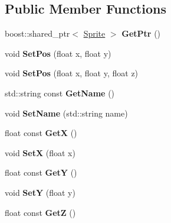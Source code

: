 \subsection*{Public Member Functions}
\begin{DoxyCompactItemize}
\item 
boost\+::shared\+\_\+ptr$<$ \hyperlink{class_sprite}{Sprite} $>$ {\bfseries Get\+Ptr} ()\hypertarget{class_sprite_af2665e7f459c2df1b74e69daaf44c19a}{}\label{class_sprite_af2665e7f459c2df1b74e69daaf44c19a}

\item 
void {\bfseries Set\+Pos} (float x, float y)\hypertarget{class_sprite_afea5e8f8f745b1db09b86f45943283af}{}\label{class_sprite_afea5e8f8f745b1db09b86f45943283af}

\item 
void {\bfseries Set\+Pos} (float x, float y, float z)\hypertarget{class_sprite_a31d06db54797d787445bee85b71f5dcd}{}\label{class_sprite_a31d06db54797d787445bee85b71f5dcd}

\item 
std\+::string const {\bfseries Get\+Name} ()\hypertarget{class_sprite_aa590f40b37b1a933aa373d907f5c8ae5}{}\label{class_sprite_aa590f40b37b1a933aa373d907f5c8ae5}

\item 
void {\bfseries Set\+Name} (std\+::string name)\hypertarget{class_sprite_a03e3fa1da28c44d7731cf09bba12fa08}{}\label{class_sprite_a03e3fa1da28c44d7731cf09bba12fa08}

\item 
float const {\bfseries GetX} ()\hypertarget{class_sprite_ad878be7d0af1494307f89cc8b4d06dbf}{}\label{class_sprite_ad878be7d0af1494307f89cc8b4d06dbf}

\item 
void {\bfseries SetX} (float x)\hypertarget{class_sprite_a87a083a64e6684aa8c5fe9965f3093af}{}\label{class_sprite_a87a083a64e6684aa8c5fe9965f3093af}

\item 
float const {\bfseries GetY} ()\hypertarget{class_sprite_ab639bc265bb54792c4bbf64dca743139}{}\label{class_sprite_ab639bc265bb54792c4bbf64dca743139}

\item 
void {\bfseries SetY} (float y)\hypertarget{class_sprite_ab5d4b3fd91f5c6d5bed02bf5eaf386ab}{}\label{class_sprite_ab5d4b3fd91f5c6d5bed02bf5eaf386ab}

\item 
float const {\bfseries GetZ} ()\hypertarget{class_sprite_a2aeadc82324dd417bd34e0e915dafecb}{}\label{class_sprite_a2aeadc82324dd417bd34e0e915dafecb}


\end{DoxyCompactItemize}
